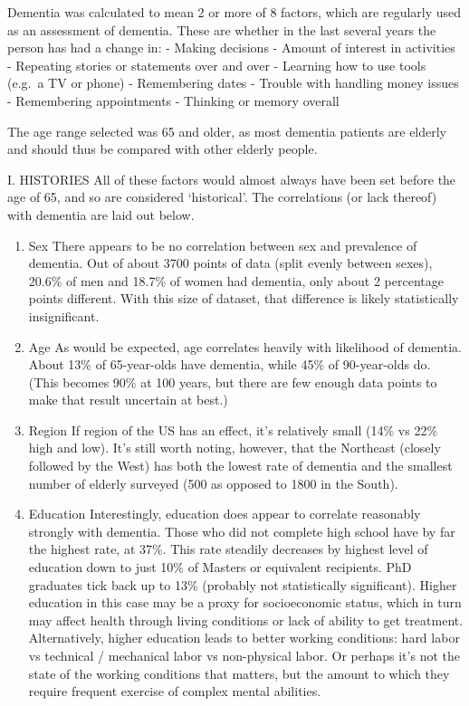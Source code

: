 \documentclass[]{article}
\begin{document}
Dementia was calculated to mean 2 or more of 8 factors, which are
regularly used as an assessment of dementia. These are whether in the
last several years the person has had a change in: - Making decisions -
Amount of interest in activities - Repeating stories or statements over
and over - Learning how to use tools (e.g.~a TV or phone) - Remembering
dates - Trouble with handling money issues - Remembering appointments -
Thinking or memory overall

The age range selected was 65 and older, as most dementia patients are
elderly and should thus be compared with other elderly people.

I. HISTORIES All of these factors would almost always have been set
before the age of 65, and so are considered `historical'. The
correlations (or lack thereof) with dementia are laid out below.

\begin{enumerate}
\def\labelenumi{\alph{enumi}.}
\item
  Sex There appears to be no correlation between sex and prevalence of
  dementia. Out of about 3700 points of data (split evenly between
  sexes), 20.6\% of men and 18.7\% of women had dementia, only about 2
  percentage points different. With this size of dataset, that
  difference is likely statistically insignificant.
\item
  Age As would be expected, age correlates heavily with likelihood of
  dementia. About 13\% of 65-year-olds have dementia, while 45\% of
  90-year-olds do. (This becomes 90\% at 100 years, but there are few
  enough data points to make that result uncertain at best.)
\item
  Region If region of the US has an effect, it's relatively small (14\%
  vs 22\% high and low). It's still worth noting, however, that the
  Northeast (closely followed by the West) has both the lowest rate of
  dementia and the smallest number of elderly surveyed (500 as opposed
  to 1800 in the South).
\item
  Education Interestingly, education does appear to correlate reasonably
  strongly with dementia. Those who did not complete high school have by
  far the highest rate, at 37\%. This rate steadily decreases by highest
  level of education down to just 10\% of Masters or equivalent
  recipients. PhD graduates tick back up to 13\% (probably not
  statistically significant). Higher education in this case may be a
  proxy for socioeconomic status, which in turn may affect health
  through living conditions or lack of ability to get treatment.
  Alternatively, higher education leads to better working conditions:
  hard labor vs technical / mechanical labor vs non-physical labor. Or
  perhaps it's not the state of the working conditions that matters, but
  the amount to which they require frequent exercise of complex mental
  abilities.
\end{enumerate}
\end{document}
